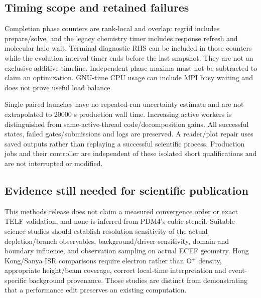 \subsection{Timing scope and retained failures}
Completion phase counters are rank-local and overlap: regrid includes
prepare/solve, and the legacy chemistry timer includes response refresh
and molecular halo wait. Terminal diagnostic RHS can be included in those
counters while the evolution interval timer ends before the last snapshot.
They are not an exclusive additive timeline. Independent phase maxima
must not be subtracted to claim an optimization. GNU-time CPU usage can
include MPI busy waiting and does not prove useful load balance.

Single paired launches have no repeated-run uncertainty estimate and are
not extrapolated to 20000 s production wall time. Increasing active workers
is distinguished from same-active-thread code/decomposition gains. All
successful states, failed gates/submissions and logs are preserved. A
reader/plot repair uses saved outputs rather than replaying a successful
scientific process. Production jobs and their controller are independent
of these isolated short qualifications and are not interrupted or modified.

\subsection{Evidence still needed for scientific publication}
This methods release does not claim a measured convergence order or exact
TELF validation, and none is inferred from PDM4's cubic stencil. Suitable
science studies should establish resolution sensitivity of the actual
depletion/branch observables, background/driver sensitivity, domain and
boundary influence, and observation sampling on actual ECEF geometry.
Hong Kong/Sanya ISR comparisons require electron rather than O$^+$ density,
appropriate height/beam coverage, correct local-time interpretation and
event-specific background provenance. Those studies are distinct from
demonstrating that a performance edit preserves an existing computation.
